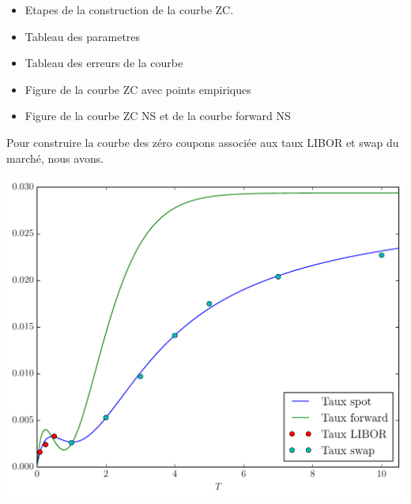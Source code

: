 \begin{itemize}
\item Etapes de la construction de la courbe ZC.
\item Tableau des parametres
\item Tableau des erreurs de la courbe
\item Figure de la courbe ZC avec points empiriques
\item Figure de la courbe ZC NS et de la courbe forward NS
\end{itemize}

Pour construire la courbe des zéro coupons associée aux taux LIBOR et swap du marché, nous
avons.


\includegraphics[width=0.3\paperwidth]{../fig/fwd_r.pdf}






